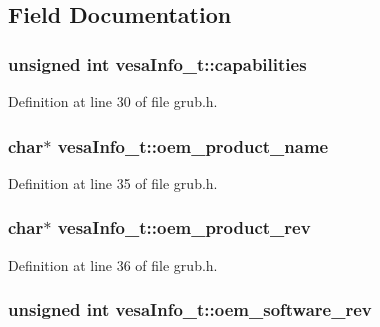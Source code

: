 \subsection{Field Documentation}
\hypertarget{structvesaInfo__t_a1f4453c48c6629e27fd2e97948deb62b}{
\subsubsection[{capabilities}]{\setlength{\rightskip}{0pt plus 5cm}unsigned int vesa\+Info\+\_\+t\+::capabilities}}\label{structvesaInfo__t_a1f4453c48c6629e27fd2e97948deb62b}


Definition at line 30 of file grub.\+h.

\hypertarget{structvesaInfo__t_a532306633838e6bc58a9e91f69835302}{
\subsubsection[{oem\+\_\+product\+\_\+name}]{\setlength{\rightskip}{0pt plus 5cm}char$\ast$ vesa\+Info\+\_\+t\+::oem\+\_\+product\+\_\+name}}\label{structvesaInfo__t_a532306633838e6bc58a9e91f69835302}


Definition at line 35 of file grub.\+h.

\hypertarget{structvesaInfo__t_a4df6ee9c56e2171999b8346550e2273f}{
\subsubsection[{oem\+\_\+product\+\_\+rev}]{\setlength{\rightskip}{0pt plus 5cm}char$\ast$ vesa\+Info\+\_\+t\+::oem\+\_\+product\+\_\+rev}}\label{structvesaInfo__t_a4df6ee9c56e2171999b8346550e2273f}


Definition at line 36 of file grub.\+h.

\hypertarget{structvesaInfo__t_af0e5f50889726f62d961141ee8fa06f3}{
\subsubsection[{oem\+\_\+software\+\_\+rev}]{\setlength{\rightskip}{0pt plus 5cm}unsigned int vesa\+Info\+\_\+t\+::oem\+\_\+software\+\_\+rev}}\label{structvesaInfo__t_af0e5f50889726f62d961141ee8fa06f3}


